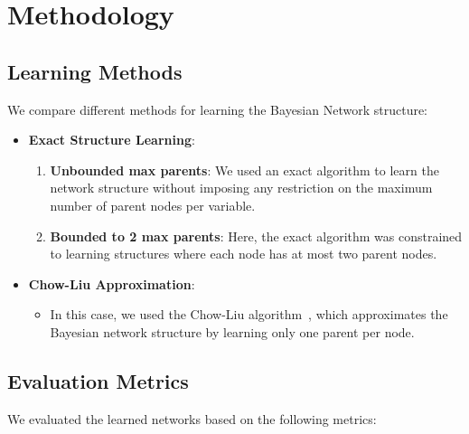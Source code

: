 \section{Methodology}
\subsection{Learning Methods}

We compare different methods for learning the Bayesian Network structure:

\begin{itemize}
    \item \textbf{Exact Structure Learning}:
        \begin{enumerate}
            \item \textbf{Unbounded max parents}: We used an exact algorithm to learn the network structure without imposing any restriction on the maximum number of parent nodes per variable.
            \item \textbf{Bounded to 2 max parents}: Here, the exact algorithm was constrained to learning structures where each node has at most two parent nodes.
        \end{enumerate}
        
    \item \textbf{Chow-Liu Approximation}:
        \begin{itemize}
            \item In this case, we used the Chow-Liu algorithm~\cite{chowliu1968}, which approximates the Bayesian network structure by learning only one parent per node.
        \end{itemize}
\end{itemize}

\subsection{Evaluation Metrics}

We evaluated the learned networks based on the following metrics:

